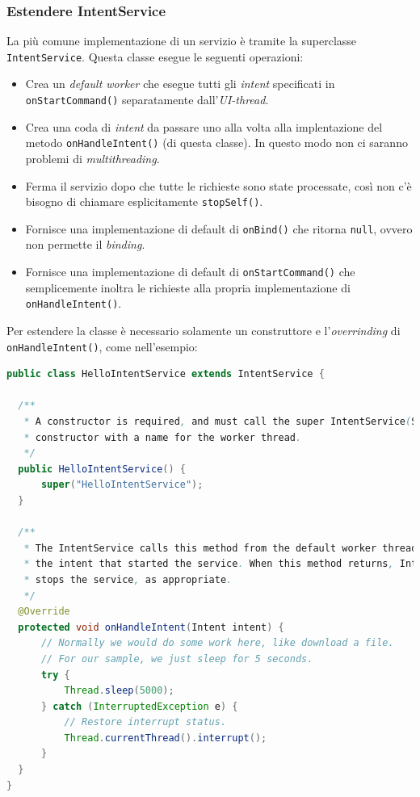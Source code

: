 \documentclass{book}
\begin{document}
\subsubsection{Estendere IntentService}
La più comune implementazione di un servizio è tramite la superclasse \texttt{IntentService}.
Questa classe esegue le seguenti operazioni:
\begin{itemize}
	\item Crea un \textit{default worker} che esegue tutti gli \textit{intent} specificati in \texttt{onStartCommand()} separatamente dall'\textit{UI-thread}.
	\item Crea una coda di \textit{intent} da passare uno alla volta alla implentazione del metodo \texttt{onHandleIntent()} (di questa classe). In questo modo non ci saranno problemi di \textit{multithreading}.
	\item Ferma il servizio dopo che tutte le richieste sono state processate, così non c'è bisogno di chiamare esplicitamente \texttt{stopSelf()}.
	\item Fornisce una implementazione di default di \texttt{onBind()} che ritorna \texttt{null}, ovvero non permette il \textit{binding}.
	\item Fornisce una implementazione di default di \texttt{onStartCommand()} che semplicemente inoltra le richieste alla propria implementazione di \texttt{onHandleIntent()}.
\end{itemize}

Per estendere la classe è necessario solamente un construttore e l'\textit{overrinding} di \texttt{onHandleIntent()}, come nell'esempio:

\begin{lstlisting}[language=Java]
public class HelloIntentService extends IntentService {

  /**
   * A constructor is required, and must call the super IntentService(String)
   * constructor with a name for the worker thread.
   */
  public HelloIntentService() {
      super("HelloIntentService");
  }

  /**
   * The IntentService calls this method from the default worker thread with
   * the intent that started the service. When this method returns, IntentService
   * stops the service, as appropriate.
   */
  @Override
  protected void onHandleIntent(Intent intent) {
      // Normally we would do some work here, like download a file.
      // For our sample, we just sleep for 5 seconds.
      try {
          Thread.sleep(5000);
      } catch (InterruptedException e) {
          // Restore interrupt status.
          Thread.currentThread().interrupt();
      }
  }
}
\end{lstlisting}
\end{document}
